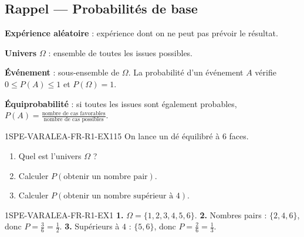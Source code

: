 
\subsection*{Rappel — Probabilités de base}

\textbf{Expérience aléatoire} : expérience dont on ne peut pas prévoir le résultat.

\textbf{Univers} $\Omega$ : ensemble de toutes les issues possibles.

\textbf{Événement} : sous-ensemble de $\Omega$. La probabilité d'un événement $A$ vérifie $0 \leq P(A) \leq 1$ et $P(\Omega) = 1$.

\textbf{Équiprobabilité} : si toutes les issues sont également probables, $P(A) = \frac{\text{nombre de cas favorables}}{\text{nombre de cas possibles}}$.

\begin{exercice}{1SPE-VARALEA-FR-R1-EX1}{1}{5}
On lance un dé équilibré à $6$ faces.
\begin{enumerate}
  \item Quel est l'univers $\Omega$ ?
  \item Calculer $P(\text{obtenir un nombre pair})$.
  \item Calculer $P(\text{obtenir un nombre supérieur à 4})$.
\end{enumerate}
\end{exercice}


\begin{corrige}{1SPE-VARALEA-FR-R1-EX1}
\textbf{1.} $\Omega = \{1,2,3,4,5,6\}$.
\textbf{2.} Nombres pairs : $\{2,4,6\}$, donc $P = \frac{3}{6} = \frac{1}{2}$.
\textbf{3.} Supérieurs à $4$ : $\{5,6\}$, donc $P = \frac{2}{6} = \frac{1}{3}$.
\end{corrige}
